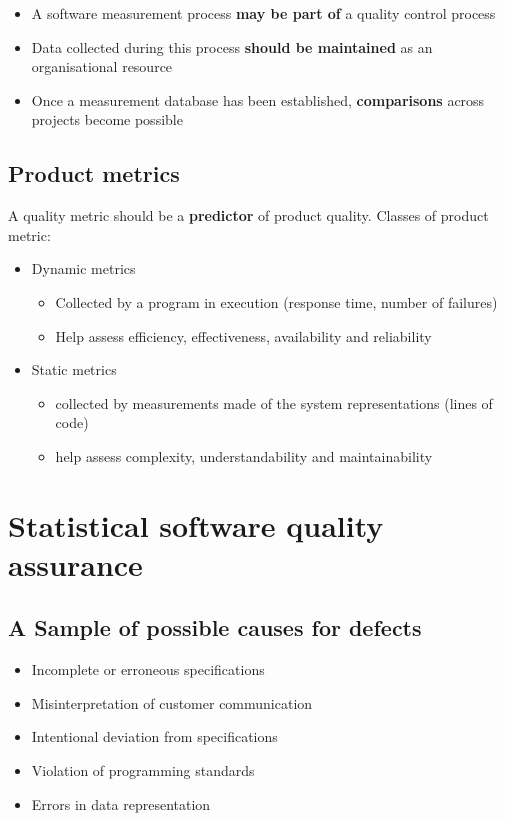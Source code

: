 \documentclass{article}
\begin{document}
\begin{itemize}
  \item A software measurement process \textbf{may be part of} a quality control process
  \item Data collected during this process \textbf{should be maintained} as an organisational resource
  \item Once a measurement database has been established, \textbf{comparisons} across projects become possible
\end{itemize}

\subsection{Product metrics}

\begin{flushleft}
A quality metric should be a \textbf{predictor} of product quality. Classes of product metric:
\begin{itemize}
  \item Dynamic metrics
  \begin{itemize}
    \item Collected by a program in execution (response time, number of failures)
    \item Help assess efficiency, effectiveness, availability and reliability
  \end{itemize}
  \item Static metrics
  \begin{itemize}
    \item collected by measurements made of the system representations (lines of code)
    \item help assess complexity, understandability and maintainability
  \end{itemize}
\end{itemize}
\end{flushleft}

\section{Statistical software quality assurance}

\subsection{A Sample of possible causes for defects}

\begin{itemize}
  \item Incomplete or erroneous specifications
  \item Misinterpretation of customer communication 
  \item Intentional deviation from specifications 
  \item Violation of programming standards 
  \item Errors in data representation
\end{itemize}
\end{document}
